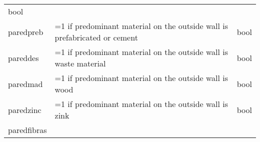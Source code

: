 \documentclass[11pt]{article}
\begin{document}
\begin{longtable}[]{@{}lll@{}}
\begin{minipage}[t]{0.24\columnwidth}
bool\strut
\end{minipage}\tabularnewline
\begin{minipage}[t]{0.19\columnwidth}\raggedright\strut
paredpreb\strut
\end{minipage} & \begin{minipage}[t]{0.16\columnwidth}\raggedright\strut
=1 if predominant material on the outside wall is prefabricated or
cement\strut
\end{minipage} & \begin{minipage}[t]{0.24\columnwidth}\raggedright\strut
bool\strut
\end{minipage}\tabularnewline
\begin{minipage}[t]{0.19\columnwidth}\raggedright\strut
pareddes\strut
\end{minipage} & \begin{minipage}[t]{0.16\columnwidth}\raggedright\strut
=1 if predominant material on the outside wall is waste material\strut
\end{minipage} & \begin{minipage}[t]{0.24\columnwidth}\raggedright\strut
bool\strut
\end{minipage}\tabularnewline
\begin{minipage}[t]{0.19\columnwidth}\raggedright\strut
paredmad\strut
\end{minipage} & \begin{minipage}[t]{0.16\columnwidth}\raggedright\strut
=1 if predominant material on the outside wall is wood\strut
\end{minipage} & \begin{minipage}[t]{0.24\columnwidth}\raggedright\strut
bool\strut
\end{minipage}\tabularnewline
\begin{minipage}[t]{0.19\columnwidth}\raggedright\strut
paredzinc\strut
\end{minipage} & \begin{minipage}[t]{0.16\columnwidth}\raggedright\strut
=1 if predominant material on the outside wall is zink\strut
\end{minipage} & \begin{minipage}[t]{0.24\columnwidth}\raggedright\strut
bool\strut
\end{minipage}\tabularnewline
\begin{minipage}[t]{0.19\columnwidth}\raggedright\strut
paredfibras\strut
\end{minipage} & \begin{minipage}[t]{0.16\columnwidth}\raggedright\strut

\end{minipage}
\end{longtable}
\end{document}

